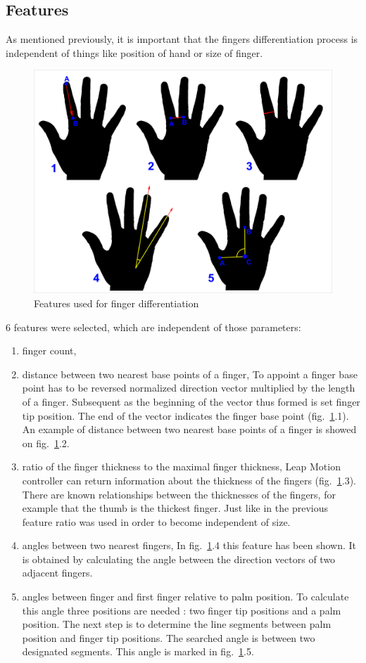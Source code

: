 \subsection{Features}
As mentioned previously, it is important that the fingers differentiation process is independent of things like position of hand or size of finger. 

\begin{figure}[htb]
\centering
 \includegraphics[width=0.75\columnwidth]{figures/fingDiffFeatures.png}
 \caption{Features used for finger differentiation}
 \label{fingfifffeatures}
\end{figure}

6 features were selected, which are independent of those parameters: 
\begin{enumerate}
\item finger count, 
\item distance between two nearest base points of a finger, 
To appoint a finger base point has to be reversed normalized direction vector multiplied by the length of a finger. Subsequent as the beginning of the vector thus formed is set finger tip position. The end of the vector indicates the finger base point (fig.~\ref{fingfifffeatures}.1). An example of distance between two nearest base points of a finger is showed on fig.~\ref{fingfifffeatures}.2.
\item ratio of the finger thickness to the maximal finger thickness, 
Leap Motion controller can return information about the thickness of the fingers (fig.~\ref{fingfifffeatures}.3). There are known relationships between the thicknesses of the fingers, for example that the thumb is the thickest finger. Just like in the previous feature ratio was used in order to become independent of size.
\item angles between two nearest fingers, 
In fig.~\ref{fingfifffeatures}.4  this feature has been shown. It is obtained by calculating the angle between the direction vectors of two adjacent fingers.
\item angles between finger and first finger relative to palm position. 
To calculate this angle three positions are needed : two finger tip positions and a palm position. The next step is to determine the line segments between palm position and finger tip positions. The searched angle is between two designated segments. This angle is marked in fig.~\ref{fingfifffeatures}.5.
\end{enumerate}

